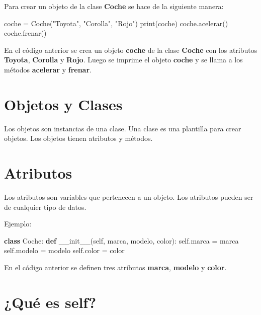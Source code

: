 \documentclass[
  a4paper,
  DIV=11,
  numbers=noendperiod,
  onepage,
  openany]{scrreprt}
\newenvironment{Shaded}{\begin{snugshade}}{\end{snugshade}}
\newcommand{\BuiltInTok}[1]{\textcolor[rgb]{0.00,0.23,0.31}{#1}}
\newcommand{\FunctionTok}[1]{\textcolor[rgb]{0.28,0.35,0.67}{#1}}
\newcommand{\KeywordTok}[1]{\textcolor[rgb]{0.00,0.23,0.31}{\textbf{#1}}}
\newcommand{\NormalTok}[1]{\textcolor[rgb]{0.00,0.23,0.31}{#1}}
\newcommand{\OperatorTok}[1]{\textcolor[rgb]{0.37,0.37,0.37}{#1}}
\newcommand{\StringTok}[1]{\textcolor[rgb]{0.13,0.47,0.30}{#1}}
\newcommand{\VariableTok}[1]{\textcolor[rgb]{0.07,0.07,0.07}{#1}}
\begin{document}
Para crear un objeto de la clase \textbf{Coche} se hace de la siguiente
manera:

\begin{Shaded}
\begin{Highlighting}[]
\NormalTok{coche }\OperatorTok{=}\NormalTok{ Coche(}\StringTok{"Toyota"}\NormalTok{, }\StringTok{"Corolla"}\NormalTok{, }\StringTok{"Rojo"}\NormalTok{)}
\BuiltInTok{print}\NormalTok{(coche)}
\NormalTok{coche.acelerar()}
\NormalTok{coche.frenar()}
\end{Highlighting}
\end{Shaded}

En el código anterior se crea un objeto \textbf{coche} de la clase
\textbf{Coche} con los atributos \textbf{Toyota}, \textbf{Corolla} y
\textbf{Rojo}. Luego se imprime el objeto \textbf{coche} y se llama a
los métodos \textbf{acelerar} y \textbf{frenar}.

\section{Objetos y Clases}\label{objetos-y-clases}

Los objetos son instancias de una clase. Una clase es una plantilla para
crear objetos. Los objetos tienen atributos y métodos.

\section{Atributos}\label{atributos}

Los atributos son variables que pertenecen a un objeto. Los atributos
pueden ser de cualquier tipo de datos.

Ejemplo:

\begin{Shaded}
\begin{Highlighting}[]
\KeywordTok{class}\NormalTok{ Coche:}
    \KeywordTok{def} \FunctionTok{\_\_init\_\_}\NormalTok{(}\VariableTok{self}\NormalTok{, marca, modelo, color):}
        \VariableTok{self}\NormalTok{.marca }\OperatorTok{=}\NormalTok{ marca}
        \VariableTok{self}\NormalTok{.modelo }\OperatorTok{=}\NormalTok{ modelo}
        \VariableTok{self}\NormalTok{.color }\OperatorTok{=}\NormalTok{ color}
\end{Highlighting}
\end{Shaded}

En el código anterior se definen tres atributos \textbf{marca},
\textbf{modelo} y \textbf{color}.

\section{¿Qué es self?}\label{quuxe9-es-self}
\end{document}

